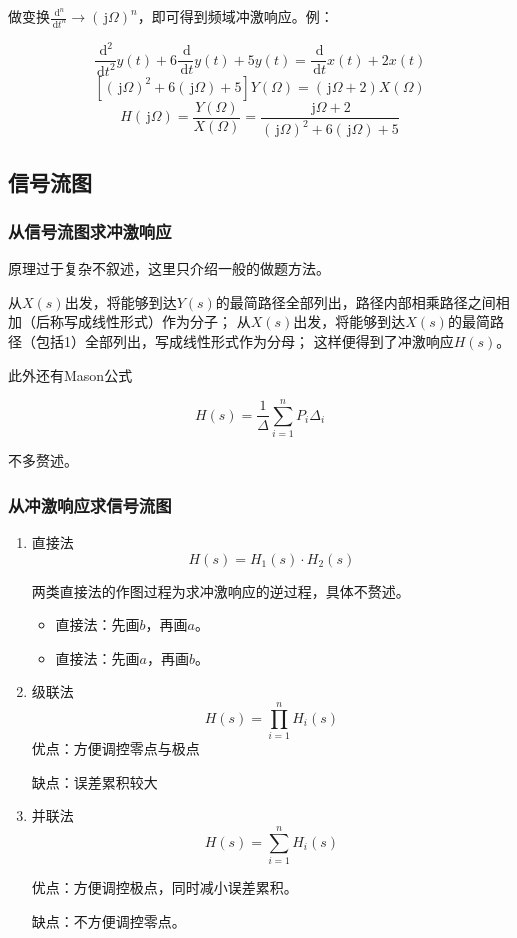 \documentclass[UTF8,fontset=fandol,zihao=5]{ctexart}
\newcommand{\jj}{\,\mathrm{j}}
\newcommand{\dd}{\,\mathrm{d}}
\begin{document}
\begin{methodbox}[【技巧】从微分方程推得频域冲激响应]
  做变换$\displaystyle \frac{\dd^n}{\dd t^n} \longrightarrow (\jj \varOmega)^n$，即可得到频域冲激响应。例：

  \[
  \frac{\dd^2}{\dd t^2}y(t)+6\frac{\dd}{\dd t}y(t)+5y(t)=\frac{\dd}{\dd t}x(t)+2x(t)
  \]
  \[
  \left[(\jj \varOmega)^2+6(\jj \varOmega)+5\right]Y(\varOmega)=(\jj \varOmega+2)X(\varOmega)
  \]
  \[
  H(\jj\varOmega)=\frac{Y(\varOmega)}{X(\varOmega)}=\frac{\jj \varOmega+2}{(\jj \varOmega)^2+6(\jj \varOmega)+5}
  \]

\end{methodbox}

\subsection{信号流图}

\subsubsection{从信号流图求冲激响应}

原理过于复杂不叙述，这里只介绍一般的做题方法。

从$X(s)$出发，将能够到达$Y(s)$的最简路径全部列出，路径内部相乘路径之间相加（后称写成线性形式）作为分子；
从$X(s)$出发，将能够到达$X(s)$的最简路径（包括1）全部列出，写成线性形式作为分母；
这样便得到了冲激响应$H(s)$。

此外还有Mason公式

\[
H(s)=\frac{1}{\varDelta}\sum_{i=1}^{n}{P_i\varDelta_i}
\]

不多赘述。

\subsubsection{从冲激响应求信号流图}

\begin{enumerate}
  \item 直接法
  \[
  H(s)=H_1(s) \cdot H_2(s)
  \]
  \begin{methodbox}[用直接法做信号流图]
    两类直接法的作图过程为求冲激响应的逆过程，具体不赘述。
    \begin{itemize}
      \item 直接法\uppercase\expandafter{}：先画$b$，再画$a$。
      
      \item 直接法\uppercase\expandafter{}：先画$a$，再画$b$。
    \end{itemize}
  \end{methodbox}
  \item 级联法
  \[
  H(s)=\prod_{i=1}^{n}H_i(s)
  \]
  优点：方便调控零点与极点

  缺点：误差累积较大
  
  \item 并联法
  \[
  H(s)=\sum_{i=1}^{n}H_i(s)
  \]
  
  优点：方便调控极点，同时减小误差累积。

  缺点：不方便调控零点。
\end{enumerate}
\end{document}
